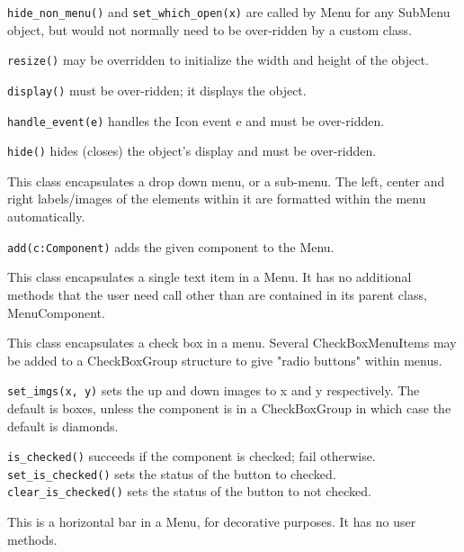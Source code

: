 \texttt{hide\_non\_menu()} and \texttt{set\_which\_open(x)} are called
by Menu for any SubMenu object,
but would not normally need to be over-ridden by a custom class.

\texttt{resize()} may be overridden to initialize the width and height
of the object.

\texttt{display()} must be over-ridden; it displays the object.

\texttt{handle\_event(e)} handles the Icon event e and must be over-ridden.

\texttt{hide()} hides (closes) the object's display and must be
over-ridden.


This class encapsulates a drop down menu, or a sub-menu. The left,
center and right labels/images of the elements within it are formatted
within the menu automatically.

\texttt{add(c:Component)} adds the given component to the Menu.


This class encapsulates a single text item in a Menu. It has no
additional methods that the user need call other than are contained in
its parent class, MenuComponent.


This class encapsulates a check box in a menu. Several CheckBoxMenuItems
may be added to a CheckBoxGroup structure to give "radio
buttons" within menus.

\texttt{set\_imgs(x, y)} sets the up and down images to x and y respectively.
The default is boxes, unless
the component is in a CheckBoxGroup in which case the
default is diamonds.

\texttt{is\_checked()} succeeds if the component is checked; fail
otherwise.\\
\texttt{set\_is\_checked()} sets the status of the button to checked.\\
\texttt{clear\_is\_checked()} sets the status of the button to not checked.


This is a horizontal bar in a Menu, for decorative purposes. It
has no user methods.


